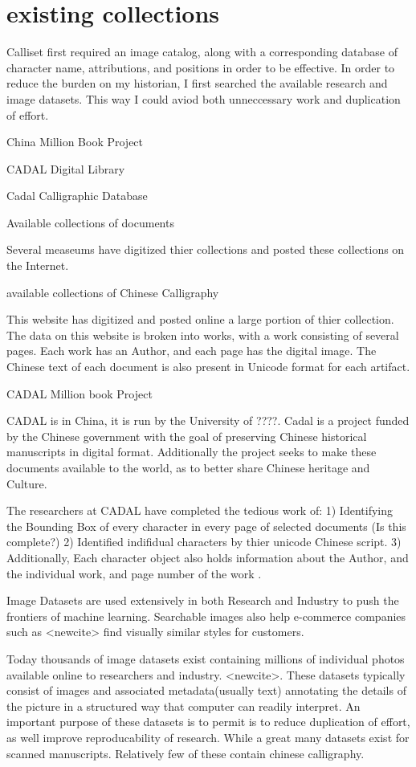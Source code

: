 \chapter{existing collections}
Calliset first required an image catalog, along with a corresponding database of character name, attributions, and positions in order to be effective.  In order to reduce the burden on my historian, I first searched the available research and image datasets.  This way I could aviod both unneccessary work and duplication of effort.


China Million Book Project

CADAL Digital Library

Cadal Calligraphic Database

Available collections of documents

Several measeums have digitized thier collections and posted these collections on the Internet.

available collections of Chinese Calligraphy

This website has digitized and posted online a large portion of thier collection.  The data on this website is broken into works, with a work consisting of several pages.  Each work has an Author, and each page has the digital image.  The Chinese text of each document is also present in Unicode format for each artifact.


CADAL Million book Project

CADAL is in China, it is run by the University of ????.  Cadal is a project funded by the Chinese government with the goal of preserving Chinese historical manuscripts in digital format.  Additionally the project seeks to make these documents available to the world, as to better share Chinese heritage and Culture.

The researchers at CADAL have completed the tedious work of:
1) Identifying the Bounding Box of every character in every page of selected documents (Is this complete?)
2) Identified indifidual characters by thier unicode Chinese script.
3) Additionally, Each character object also holds information about the Author, and the individual work, and page number of the work .


Image Datasets are used extensively in both Research and Industry to push the frontiers of machine learning.  Searchable images also help e-commerce companies such as <newcite> find visually similar styles for customers.

Today thousands of image datasets exist containing millions of individual photos available online to researchers and industry.  <newcite>.  These datasets typically consist of images and associated metadata(usually text) annotating the details of the picture in a structured way that computer can readily interpret.  An important purpose of these datasets is to permit is to reduce duplication of effort, as well improve reproducability of research.  While a great many datasets exist for scanned manuscripts.  Relatively few of these contain chinese calligraphy.

